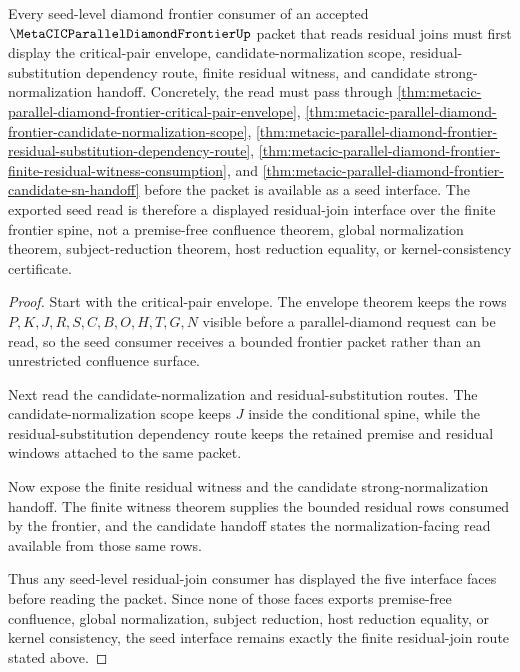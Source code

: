 \begin{theorem}
\label{thm:metacic-parallel-diamond-frontier-residual-join-seed-interface}
Every seed-level diamond frontier consumer of an accepted $\MetaCICParallelDiamondFrontierUp$ packet that reads residual joins must first display the critical-pair envelope, candidate-normalization scope, residual-substitution dependency route, finite residual witness, and candidate strong-normalization handoff. Concretely, the read must pass through \autoref{thm:metacic-parallel-diamond-frontier-critical-pair-envelope}, \autoref{thm:metacic-parallel-diamond-frontier-candidate-normalization-scope}, \autoref{thm:metacic-parallel-diamond-frontier-residual-substitution-dependency-route}, \autoref{thm:metacic-parallel-diamond-frontier-finite-residual-witness-consumption}, and \autoref{thm:metacic-parallel-diamond-frontier-candidate-sn-handoff} before the packet is available as a seed interface. The exported seed read is therefore a displayed residual-join interface over the finite frontier spine, not a premise-free confluence theorem, global normalization theorem, subject-reduction theorem, host reduction equality, or kernel-consistency certificate.
\end{theorem}
\begin{proof}
Start with the critical-pair envelope. The envelope theorem keeps the rows $P,K,J,R,S,C,B,O,H,T,G,N$ visible before a parallel-diamond request can be read, so the seed consumer receives a bounded frontier packet rather than an unrestricted confluence surface.

Next read the candidate-normalization and residual-substitution routes. The candidate-normalization scope keeps $J$ inside the conditional spine, while the residual-substitution dependency route keeps the retained premise and residual windows attached to the same packet.

Now expose the finite residual witness and the candidate strong-normalization handoff. The finite witness theorem supplies the bounded residual rows consumed by the frontier, and the candidate handoff states the normalization-facing read available from those same rows.

Thus any seed-level residual-join consumer has displayed the five interface faces before reading the packet. Since none of those faces exports premise-free confluence, global normalization, subject reduction, host reduction equality, or kernel consistency, the seed interface remains exactly the finite residual-join route stated above.
\end{proof}
